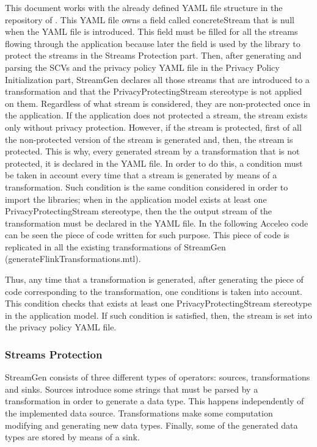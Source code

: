 This document works with the already defined YAML file structure in the repository of \cite{privacypoliciesarticle}. This YAML file owns a field called concreteStream that is null when the YAML file is introduced. This field must be filled for all the streams flowing through the application because later the field is used by the library to protect the streams in the Streams Protection part. Then, after generating and parsing the SCVs and the privacy policy YAML file in the Privacy Policy Initialization part, StreamGen declares all those streams that are introduced to a transformation and that the PrivacyProtectingStream stereotype is not applied on them. Regardless of what stream is considered, they are non-protected once in the application. If the application does not protected a stream, the stream exists only without privacy protection. However, if the stream is protected, first of all the non-protected version of the stream is generated and, then, the stream is protected. This is why, every generated stream by a transformation that is not protected, it is declared in the YAML file. In order to do this, a condition must be taken in account every time that a stream is generated by means of a transformation. Such condition is the same condition considered in order to import the libraries; when in the application model exists at least one PrivacyProtectingStream stereotype, then the the output stream of the transformation must be declared in the YAML file. In the following Acceleo code can be seen the piece of code written for such purpose. This piece of code is replicated in all the existing transformations of StreamGen (generateFlinkTransformations.mtl).



Thus, any time that a transformation is generated, after generating the piece of code corresponding to the transformation, one conditions is taken into account. This condition checks that exists at least one PrivacyProtectingStream stereotype in the application model. If such condition is satisfied, then, the stream is set into the privacy policy YAML file.

\subsubsection{Streams Protection}

StreamGen consists of three different types of operators: sources, transformations and sinks. Sources introduce some strings that must be parsed by a transformation in order to generate a data type. This happens independently of the implemented data source. Transformations make some computation modifying and generating new data types. Finally, some of the generated data types are stored by means of a sink.

